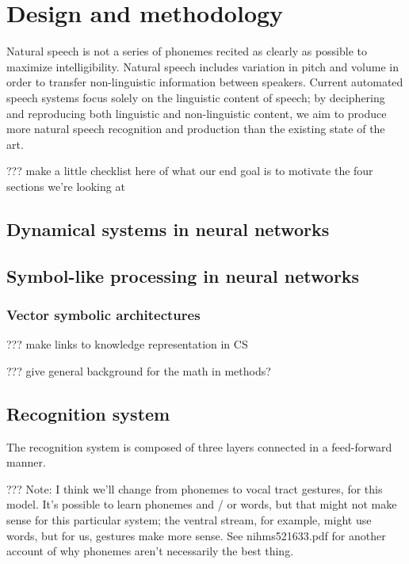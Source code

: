 \chapter{Design and methodology}



Natural speech is not a series of phonemes
recited as clearly as possible
to maximize intelligibility.
Natural speech includes variation in
pitch and volume in order to transfer
non-linguistic information between speakers.
Current automated speech systems
focus solely on the linguistic content
of speech;
by deciphering and reproducing both
linguistic and non-linguistic content,
we aim to produce more natural speech
recognition and production
than the existing state of the art.

??? make a little checklist here of what our end goal
is to motivate the four sections we're looking at

\section{Dynamical systems in neural networks}

\section{Symbol-like processing in neural networks}

\subsection{Vector symbolic architectures}

??? make links to knowledge representation in CS

??? give general background for the math in methods?

\section{Recognition system}

The recognition system is composed of
three layers connected in a feed-forward manner.

??? Note: I think we'll change from phonemes to vocal tract gestures,
for this model. It's possible to learn phonemes and / or words,
but that might not make sense for this particular system;
the ventral stream, for example, might use words,
but for us, gestures make more sense.
See nihms521633.pdf for another account of why phonemes
aren't necessarily the best thing.

